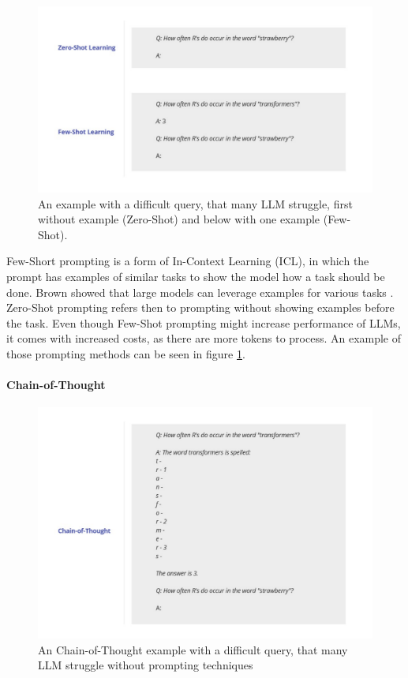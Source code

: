\begin{figure}[h!]
    \centering
    \includegraphics[width=\textwidth]{images/FewShot vs ZeroSHot.pdf}
    \caption{An example with a difficult query, that many LLM struggle, first without example (Zero-Shot) and below with one example (Few-Shot).}
    \label{fig:FewZeroShot}
\end{figure}


Few-Short prompting is a form of In-Context Learning (ICL), in which the prompt has examples of similar tasks to show the model how a task should be done. Brown showed that large models can leverage examples for various tasks \cite{Brown.28.05.2020}. Zero-Shot prompting refers then to prompting without showing examples before the task. Even though Few-Shot prompting might increase performance of LLMs, it comes with increased costs, as there are more tokens to process. An example of those prompting methods can be seen in figure \ref{fig:FewZeroShot}.

\paragraph{Chain-of-Thought}

\begin{figure}[h!]
    \centering
    \includegraphics[width=\textwidth]{images/Chain-of-Thought.pdf}
    \caption{An Chain-of-Thought example with a difficult query, that many LLM struggle without prompting techniques}
    \label{fig:CoT}
\end{figure}


